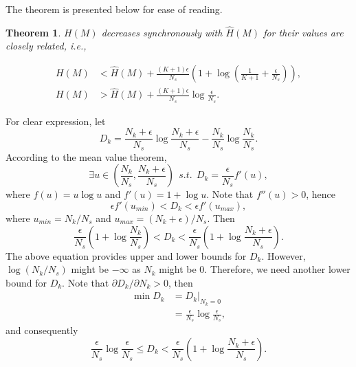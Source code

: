 \documentclass[10pt,journal,compsoc]{IEEEtran}
\newtheorem{theorem}{Theorem}
\begin{document}
The theorem is presented below for ease of reading.
\begin{theorem}
\label{theorem:1}
$H(M)$ decreases synchronously with $\hat{H}(M)$ for their values are closely related, i.e., 

\begin{equation}
    \begin{split}
    H(M) &< \hat{H}(M) + \frac{(K+1)\epsilon}{N_s}\left(1+\log \left(\frac{1}{K+1}+\frac{\epsilon}{N_s}\right)\right),\\
        H(M) &> \hat{H}(M)+ \frac{(K+1)\epsilon}{N_s} \log\frac{\epsilon}{N_s}. 
    \end{split}
\end{equation}
\end{theorem}
\begin{IEEEproof}
For clear expression, let
\begin{equation}
    D_k = \frac{N_k+\epsilon}{N_s} \log\frac{N_k+\epsilon}{N_s} - \frac{N_k}{N_s}\log\frac{N_k}{N_s}.
\end{equation}
According to the mean value theorem, 
\begin{equation}
    \exists u \in \left(\frac{N_k}{N_s}, \frac{N_k+\epsilon}{N_s}\right) \ \ s.t. \ \    D_k = \frac{\epsilon}{N_s} f'(u),
\end{equation}
where $f(u) = u\log u$ and $f'(u) = 1+\log u$. Note that $f''(u)>0$, hence
\begin{equation}
\epsilon f'(u_{min}) < D_k < \epsilon f'(u_{max}),
\end{equation}
where $u_{min}=N_k/N_s$ and $u_{max}=(N_k+\epsilon)/N_s$. Then
\begin{equation}
\frac{\epsilon}{N_s} \left(1+\log \frac{N_k}{N_s}\right) < D_k < \frac{\epsilon}{N_s} \left(1+\log \frac{N_k+\epsilon}{N_s}\right).
\end{equation}
The above equation provides upper and lower bounds for $D_k$. However, $\log (N_k/N_s)$ might be $-\infty$ as $N_k$ might be $0$. Therefore, we need another lower bound for $D_k$. Note that $\partial D_k/\partial N_k>0$, then 
\begin{equation}
    \begin{split}
      \min D_k &= D_k|_{N_k=0} \\
            &=\frac{\epsilon}{N_s}\log\frac{\epsilon}{N_s},
    \end{split}
\end{equation}
and consequently
\begin{equation}
\frac{\epsilon}{N_s} \log\frac{\epsilon}{N_s} \le D_k < \frac{\epsilon}{N_s} \left(1+\log \frac{N_k+\epsilon}{N_s}\right).

\end{equation}
\end{IEEEproof}
\end{document}
